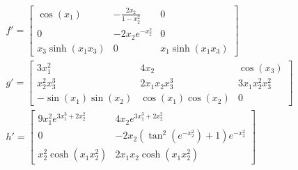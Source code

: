 \documentclass{article}
\begin{document}
\begin{align*}
    f' = \left[\begin{matrix}\cos{\left(x_{1} \right)} & - \frac{2 x_{2}}{1 - x_{2}^{2}} & 0\\0 & - 2 x_{2} e^{- x_{2}^{2}} & 0\\x_{3} \sinh{\left(x_{1} x_{3} \right)} & 0 & x_{1} \sinh{\left(x_{1} x_{3} \right)}\end{matrix}\right] \\
    g' = \left[\begin{matrix}3 x_{1}^{2} & 4 x_{2} & \cos{\left(x_{3} \right)}\\x_{2}^{2} x_{3}^{3} & 2 x_{1} x_{2} x_{3}^{3} & 3 x_{1} x_{2}^{2} x_{3}^{2}\\- \sin{\left(x_{1} \right)} \sin{\left(x_{2} \right)} & \cos{\left(x_{1} \right)} \cos{\left(x_{2} \right)} & 0\end{matrix}\right] \\
    h' = \left[\begin{matrix}9 x_{1}^{2} e^{3 x_{1}^{3} + 2 x_{2}^{2}} & 4 x_{2} e^{3 x_{1}^{3} + 2 x_{2}^{2}}\\0 & - 2 x_{2} \left(\tan^{2}{\left(e^{- x_{2}^{2}} \right)} + 1\right) e^{- x_{2}^{2}}\\x_{2}^{2} \cosh{\left(x_{1} x_{2}^{2} \right)} & 2 x_{1} x_{2} \cosh{\left(x_{1} x_{2}^{2} \right)}\end{matrix}\right]
\end{align*}
\end{document}
